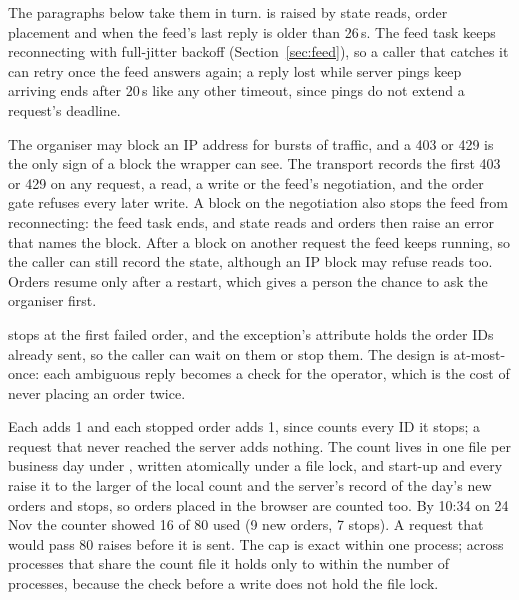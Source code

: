 

\par{}

 The paragraphs below take them in turn.  is raised by state reads, order placement and  when the feed's last reply is older than 26\,s. The feed task keeps reconnecting with full-jitter backoff (Section~\ref{sec:feed}), so a caller that catches it can retry once the feed answers again; a reply lost while server pings keep arriving ends after 20\,s like any other timeout, since pings do not extend a request's deadline.

 The organiser may block an IP address for bursts of traffic, and a 403 or 429 is the only sign of a block the wrapper can see. The transport records the first 403 or 429 on any request, a read, a write or the feed's negotiation, and the order gate refuses every later write. A block on the negotiation also stops the feed from reconnecting: the feed task ends, and state reads and orders then raise an error that names the block. After a block on another request the feed keeps running, so the caller can still record the state, although an IP block may refuse reads too. Orders resume only after a restart, which gives a person the chance to ask the organiser first.

  stops at the first failed order, and the exception's  attribute holds the order IDs already sent, so the caller can wait on them or stop them. The design is at-most-once: each ambiguous reply becomes a check for the operator, which is the cost of never placing an order twice.

 Each  adds 1 and each stopped order adds 1, since  counts every ID it stops; a request that never reached the server adds nothing. The count lives in one file per business day under \allowbreak{}, written atomically under a file lock, and start-up and every  raise it to the larger of the local count and the server's record of the day's new orders and stops, so orders placed in the browser are counted too. By 10:34 on 24 Nov the counter showed 16 of 80 used (9 new orders, 7 stops). A request that would pass 80 raises before it is sent. The cap is exact within one process; across processes that share the count file it holds only to within the number of processes, because the check before a write does not hold the file lock.

